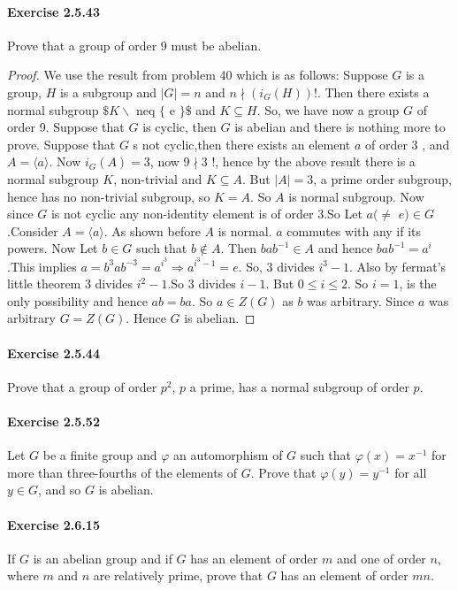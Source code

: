 \documentclass{article}
\begin{document}
\paragraph{Exercise 2.5.43} Prove that a group of order 9 must be abelian.
\begin{proof}
    We use the result from problem 40 which is as follows: Suppose $G$ is a group, $H$ is a subgroup and $|G|=n$ and $n \nmid\left(i_G(H)\right) !$. Then there exists a normal subgroup $\$ K \backslash$ neq $\{$ e $\} \$$ and $K \subseteq H$.
So, we have now a group $G$ of order 9. Suppose that $G$ is cyclic, then $G$ is abelian and there is nothing more to prove. Suppose that $G$ s not cyclic,then there exists an element $a$ of order 3 , and $A=\langle a\rangle$. Now $i_G(A)=3$, now $9 \nmid 3$ !, hence by the above result there is a normal subgroup $K$, non-trivial and $K \subseteq A$. But $|A|=3$, a prime order subgroup, hence has no non-trivial subgroup, so $K=A$. So $A$ is normal subgroup. Now since $G$ is not cyclic any non-identity element is of order 3.So Let $a(\neq$ $e) \in G$.Consider $A=\langle a\rangle$. As shown before $A$ is normal. $a$ commutes with any if its powers. Now Let $b \in G$ such that $b \notin A$. Then $b a b^{-1} \in A$ and hence $b a b^{-1}=a^i$.This implies $a=b^3 a b^{-3}=a^{i^3} \Longrightarrow a^{i^3-1}=e$. So, 3 divides $i^3-1$. Also by fermat's little theorem 3 divides $i^2-1$.So 3 divides $i-1$. But $0 \leq i \leq 2$. So $i=1$, is the only possibility and hence $a b=b a$. So $a \in Z(G)$ as $b$ was arbitrary. Since $a$ was arbitrary $G=Z(G)$. Hence $G$ is abelian.
\end{proof}



\paragraph{Exercise 2.5.44} Prove that a group of order $p^2$, $p$ a prime, has a normal subgroup of order $p$.


\paragraph{Exercise 2.5.52} Let $G$ be a finite group and $\varphi$ an automorphism of $G$ such that $\varphi(x) = x^{-1}$ for more than three-fourths of the elements of $G$. Prove that $\varphi(y) = y^{-1}$ for all $y \in G$, and so $G$ is abelian.


\paragraph{Exercise 2.6.15} If $G$ is an abelian group and if $G$ has an element of order $m$ and one of order $n$, where $m$ and $n$ are relatively prime, prove that $G$ has an element of order $mn$.
\end{document}
